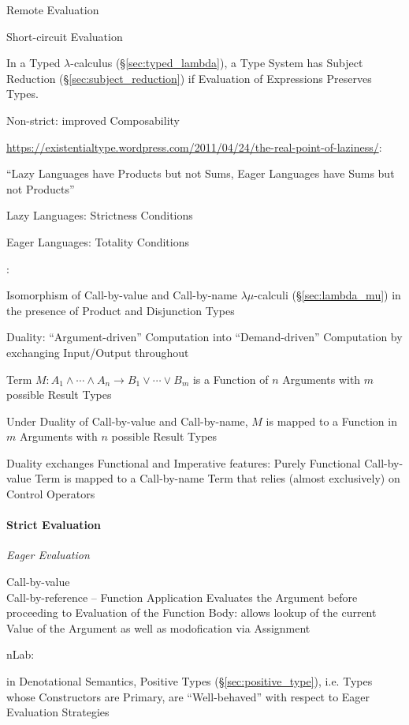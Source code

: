 Remote Evaluation

Short-circuit Evaluation

In a Typed $\lambda$-calculus (\S\ref{sec:typed_lambda}), a Type
System has Subject Reduction (\S\ref{sec:subject_reduction}) if
Evaluation of Expressions Preserves Types.

Non-strict: improved Composability %

\url{https://existentialtype.wordpress.com/2011/04/24/the-real-point-of-laziness/}:

``Lazy Languages have Products but not Sums, Eager Languages have Sums
but not Products''

Lazy Languages: Strictness Conditions %

Eager Languages: Totality Conditions %


\asterism


\cite{selinger01}:

Isomorphism of Call-by-value and Call-by-name $\lambda\mu$-calculi
(\S\ref{sec:lambda_mu}) in the presence of Product and Disjunction
Types

Duality: ``Argument-driven'' Computation into ``Demand-driven''
Computation by exchanging Input/Output throughout

Term $M : A_1 \wedge \cdots \wedge A_n \rightarrow B_1 \vee \cdots
\vee B_m$ is a Function of $n$ Arguments with $m$ possible Result
Types

Under Duality of Call-by-value and Call-by-name, $M$ is mapped to a
Function in $m$ Arguments with $n$ possible Result Types

Duality exchanges Functional and Imperative features: Purely
Functional Call-by-value Term is mapped to a Call-by-name Term that
relies (almost exclusively) on Control Operators %



\paragraph{Strict Evaluation}\label{sec:strict_evaluation}\hfill

\emph{Eager Evaluation}

Call-by-value \\
Call-by-reference -- Function Application Evaluates the Argument
before proceeding to Evaluation of the Function Body: allows lookup of
the current Value of the Argument as well as modofication via
Assignment

nLab:

in Denotational Semantics, Positive Types (\S\ref{sec:positive_type}),
i.e. Types whose Constructors are Primary, are ``Well-behaved'' with
respect to Eager Evaluation Strategies



